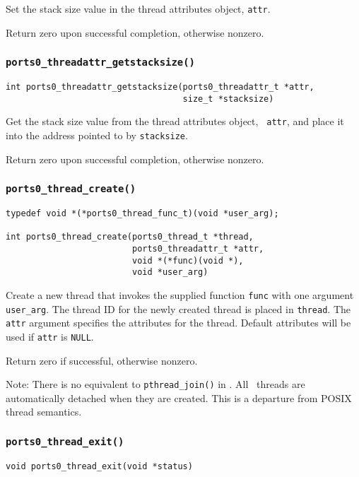 Set the stack size value in the thread attributes object, {\tt attr}.

Return zero upon successful completion, otherwise nonzero.


\subsubsection{\tt ports0\_threadattr\_getstacksize()}
\begin{verbatim}
int ports0_threadattr_getstacksize(ports0_threadattr_t *attr,
                                   size_t *stacksize)
\end{verbatim}

Get the stack size value from the thread attributes object, {\tt
attr}, and place it into the address pointed to by {\tt stacksize}.

Return zero upon successful completion, otherwise nonzero.


\subsubsection{\tt ports0\_thread\_create()}
\begin{verbatim}
typedef void *(*ports0_thread_func_t)(void *user_arg);

int ports0_thread_create(ports0_thread_t *thread,
                         ports0_threadattr_t *attr,
                         void *(*func)(void *),
                         void *user_arg)
\end{verbatim}

Create a new thread that invokes the supplied function {\tt func} with
one argument {\tt user\_arg}.  The thread ID for the newly created
thread is placed in {\tt thread}.  The {\tt attr} argument specifies
the attributes for the thread.  Default attributes will be used if
{\tt attr} is {\tt NULL}.

Return zero if successful, otherwise nonzero.

Note: There is no equivalent to {\tt pthread\_join()} in \portszero.  All
\portszero\ threads are automatically detached when they are created.
This is a departure from POSIX thread semantics.


\subsubsection{\tt ports0\_thread\_exit()}
\begin{verbatim}
void ports0_thread_exit(void *status)
\end{verbatim}

